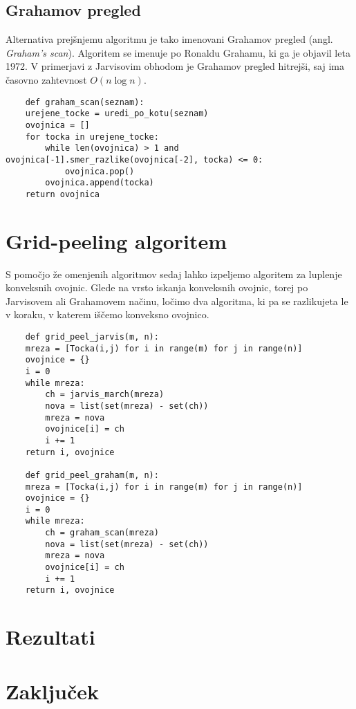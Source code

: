 \documentclass[a4paper]{article}
\begin{document}

\subsection{Grahamov pregled}
Alternativa prejšnjemu algoritmu je tako imenovani Grahamov pregled (angl. \textit{Graham's scan}). Algoritem se imenuje po Ronaldu Grahamu, ki ga je objavil leta 1972. 
V primerjavi z Jarvisovim obhodom je Grahamov pregled hitrejši, saj ima časovno zahtevnost $O(n \log n)$.

\begin{lstlisting}
    def graham_scan(seznam):
    urejene_tocke = uredi_po_kotu(seznam)
    ovojnica = []
    for tocka in urejene_tocke:
        while len(ovojnica) > 1 and ovojnica[-1].smer_razlike(ovojnica[-2], tocka) <= 0:
            ovojnica.pop()
        ovojnica.append(tocka)
    return ovojnica
\end{lstlisting}

\section{Grid-peeling algoritem}
S pomočjo že omenjenih algoritmov sedaj lahko izpeljemo algoritem za luplenje konveksnih ovojnic. Glede na vrsto iskanja konveksnih ovojnic, torej po Jarvisovem ali 
Grahamovem načinu, ločimo dva algoritma, ki pa se razlikujeta le v koraku, v katerem iščemo konveksno ovojnico.

\begin{lstlisting}
    def grid_peel_jarvis(m, n):
    mreza = [Tocka(i,j) for i in range(m) for j in range(n)]
    ovojnice = {}
    i = 0
    while mreza:
        ch = jarvis_march(mreza)
        nova = list(set(mreza) - set(ch))
        mreza = nova
        ovojnice[i] = ch
        i += 1
    return i, ovojnice

    def grid_peel_graham(m, n):
    mreza = [Tocka(i,j) for i in range(m) for j in range(n)]
    ovojnice = {}
    i = 0
    while mreza:
        ch = graham_scan(mreza)
        nova = list(set(mreza) - set(ch))
        mreza = nova
        ovojnice[i] = ch
        i += 1
    return i, ovojnice
\end{lstlisting}

\section{Rezultati}

\section{Zaključek}
\end{document}

